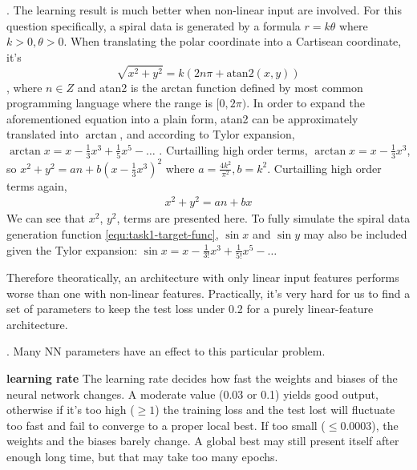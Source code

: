 \documentclass[12pt]{article}
\begin{document}
.
The learning result is much better when non-linear input are involved. For this question specifically, a spiral data is generated by a formula $r=k\theta$ where $k>0, \theta>0$. When translating the polar coordinate into a Cartisean coordinate, it's 
\begin{equation*}
\label{equ:task1-target-func}
\sqrt{x^2+y^2}=k(2n\pi+\textrm{atan2}(x,y))
\end{equation*}
, where $n\in Z$ and atan2 is the arctan function defined by most common programming language where the range is $[0,2\pi)$. In order to expand the aforementioned equation into a plain form, atan2 can be approximately translated into $\arctan$, and according to Tylor expansion, 
$\arctan x=x-\frac{1}{3}x^3+\frac{1}{5}x^5-\ldots$
. Curtailling high order terms, 
$\arctan x=x-\frac{1}{3}x^3$, 
so $x^2+y^2=an+b(x-\frac{1}{3}x^3)^2$
where $a=\frac{4k^2}{\pi^2},b=k^2$. Curtailling high order terms again, 
\begin{gather*}
x^2+y^2=an+bx
\end{gather*}
We can see that $x^2$, $y^2$, terms are presented here. To fully simulate the spiral data generation function \ref{equ:task1-target-func}, $\sin x$ and $\sin y$ may also be included given the Tylor expansion:
$
\sin x=x-\frac{1}{3!}x^3+\frac{1}{5!}x^5-\ldots
$

\noindent Therefore theoratically, an architecture with only linear input features performs worse than one with non-linear features. Practically, it's very hard for us to find a set of parameters to keep the test loss under 0.2 for a purely linear-feature architecture.

\bigskip
{}. Many NN parameters have an effect to this particular problem.

\noindent \textbf{learning rate} The learning rate decides how fast the weights and biases of the neural network changes. A moderate value (0.03 or 0.1) yields good output, otherwise if it's too high ($\geq 1$) the training loss and the test lost will fluctuate too fast and fail to converge to a proper local best. If too small ($\leq 0.0003$), the weights and the biases barely change. A global best may still present itself after enough long time, but that may take too many epochs.
\end{document}
